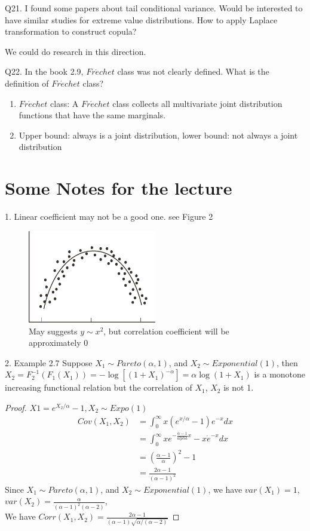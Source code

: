 \documentclass[a4paper,12pt]{texMemo}
\begin{document}
Q21. I found some papers about tail conditional variance. Would be interested to have similar studies for extreme value distributions. How to apply Laplace transformation to construct copula?

We could do research in this direction.

Q22. In the book 2.9, $Fr\acute{e}chet$ class was not clearly defined. What is the definition of $Fr\acute{e}chet$ class?

\begin{enumerate}
\item $Fr\acute{e}chet$ class: A $Fr\acute{e}chet$ class collects all multivariate joint distribution functions that have the same marginals.
\item Upper bound: always is a joint distribution, lower bound: not always a joint distribution
\end{enumerate}

\section{Some Notes for the lecture}
1. Linear coefficient may not be a good one. see Figure 2
\begin{figure}
\centering
\includegraphics[width = 0.5\textwidth]{nonlinear.png}
\caption{\label{fig: non-linear correlation}May suggests $y \sim x^2$, but correlation coefficient will be approximately 0}
\end{figure}

2. Example 2.7 Suppose $X_1 \sim Pareto(\alpha, 1)$, and $X_2 \sim Exponential(1)$, then $X_2 = F_2^{-1}(F_1(X_1)) = -\log[(1+X_1)^{-\alpha}] = \alpha \log(1+X_1)$ is a monotone increasing functional relation but the correlation of $X_1$, $X_2$ is not 1.
\begin{proof}
$X1 = e^{X_2/\alpha} - 1, X_2 \sim Expo(1)$
\begin{align*}
Cov(X_1, X_2)
& = \int_0^{\infty} x(e^{x/\alpha} - 1) e^{-x} dx\\
& = \int_0^{\infty} x e^{-\frac{\alpha - 1}{alpha}x} - x \dot e^{-x} dx\\
& = (\frac{\alpha - 1}{\alpha})^2 - 1 \\
& = \frac{2\alpha - 1}{(\alpha - 1)^2}
\end{align*}
Since $X_1 \sim Pareto(\alpha, 1)$, and $X_2 \sim Exponential(1)$, we have $var(X_1) = 1$, $var(X_2) = \frac{\alpha}{(\alpha - 1)^2 (\alpha - 2)}$,\\
We have $Corr(X_1, X_2) = \frac{2\alpha - 1}{(\alpha - 1)\sqrt{\alpha/(\alpha - 2)}}$
\end{proof}


\end{document}
